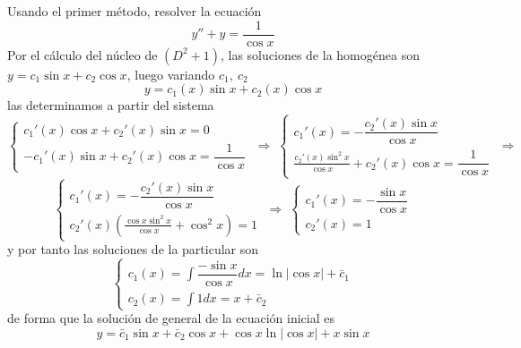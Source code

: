 \begin{eje} Usando el primer método, resolver la ecuación $$y''+y=\dfrac{1}{\cos x}$$
        Por el cálculo del núcleo de $(D^2+1)$, las soluciones de la homogénea son $y=c_1 \sin x + c_2 \cos x$, luego variando $c_1, \: c_2$
        $$y=c_1(x) \sin x + c_2(x) \cos x$$
        las determinamos a partir del sistema
        $$\left\{ \begin{array}{l}
             c_1'(x) \cos x + c_2'(x) \sin x = 0\\
             - c_1'(x) \sin x + c_2'(x) \cos x = \dfrac{1}{\cos x}
        \end{array}\right. \; \Rightarrow \; \left\{ \begin{array}{l}
             c_1'(x) = - \dfrac{c_2'(x) \sin x}{\cos x} \\
             \frac{c_2'(x) \sin^2 x}{\cos x} + c_2'(x) \cos x = \dfrac{1}{\cos x} 
        \end{array}\right. \; \Rightarrow $$
        $$\left\{ \begin{array}{l}
             c_1'(x) = - \dfrac{c_2'(x) \sin x}{\cos x} \\
             c_2'(x)\left( \frac{ \cos x \sin^2 x}{\cos x} +  \cos^2 x \right)= 1
        \end{array}\right. \; \Rightarrow \; \left\{ \begin{array}{l}
             c_1'(x) = - \dfrac{\sin x}{\cos x} \\
             c_2'(x) = 1
        \end{array}\right.$$
        y por tanto las soluciones de la particular son
        $$\left\{ \begin{array}{l}
             \displaystyle c_1(x) = \int \dfrac{-\sin x}{\cos x} dx = \ln|\cos x| + \bar{c}_1 \\
             c_2(x) = \int 1 dx = x+\bar{c}_2
        \end{array}\right.$$
        de forma que la solución de general de la ecuación inicial es 
        $$\boxed{\; y=  \bar{c}_1  \sin x + \bar{c}_2 \cos x + \cos x \ln|\cos x| + x \sin x \; }$$
    \end{eje}
    
